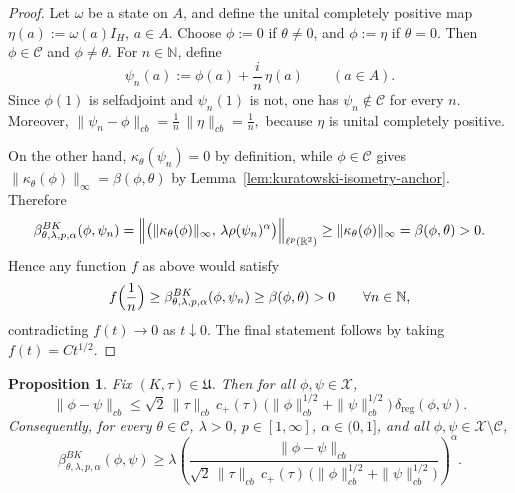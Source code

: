 \documentclass[11pt]{amsart}
\newtheorem{proposition}[theorem]{Proposition}
\theoremstyle{definition}
\theoremstyle{remark}
\newcommand{\1}{\mathbbm{1}}
\begin{document}
\begin{proof}
Let $\omega$ be a state on $A$, and define the unital completely positive map $\eta(a):=\omega(a)I_H$, $a\in A$.
Choose $\phi:=0$ if $ \theta\neq 0$, and  $\phi:=\eta$ if $\theta=0$. Then $\phi\in \mathcal C$ and $\phi\neq \theta$.
For $n\in\mathbb N$, define
\[
\psi_n(a):=\phi(a)+\frac{i}{n}\,\eta(a)\qquad(a\in A).
\]
Since $\phi(1)$ is selfadjoint and $\psi_n(1)$ is not, one has $\psi_n\notin \mathcal C$ for every $n$.
Moreover, $\|\psi_n-\phi\|_{cb}=\frac{1}{n}\,\|\eta\|_{cb}=\frac{1}{n},$
because $\eta$ is unital completely positive.

On the other hand, $\kappa_\theta(\psi_n)=0$ by definition, while $\phi\in\mathcal C$ gives $\|\kappa_\theta(\phi)\|_\infty=\beta(\phi,\theta)$
by Lemma~\ref{lem:kuratowski-isometry-anchor}. Therefore
\[
\beta^{BK}_{\theta,\lambda,p,\alpha}(\phi,\psi_n)
=\Bigl\|\bigl(\|\kappa_\theta(\phi)\|_\infty,\,\lambda\rho(\psi_n)^\alpha\bigr)\Bigr\|_{\ell^p(\mathbb R^2)}
\ge \|\kappa_\theta(\phi)\|_\infty
=\beta(\phi,\theta)>0.
\]
Hence any function $f$ as above would satisfy
\[
f\Bigl(\frac{1}{n}\Bigr)\ge \beta^{BK}_{\theta,\lambda,p,\alpha}(\phi,\psi_n)\ge \beta(\phi,\theta)>0
\qquad\forall n\in\mathbb N,
\]
contradicting $f(t)\to 0$ as $t\downarrow 0$.
The final statement follows by taking $f(t)=Ct^{1/2}$.
\end{proof}

\begin{proposition}
\label{prop:lower-KSW-nonCP}
Fix $(K,\tau)\in\mathfrak U$.
Then for all $\phi,\psi\in \mathcal X$,
\[
\|\phi-\psi\|_{cb}
\le
\sqrt2\,\|\tau\|_{cb}\, c_+(\tau)\,\bigl(\|\phi\|_{cb}^{1/2}+\|\psi\|_{cb}^{1/2}\bigr)\,\delta_{\mathrm{reg}}(\phi,\psi).
\]
Consequently, for every $\theta\in \mathcal C$, $\lambda>0$, $p\in[1,\infty]$, $\alpha\in(0,1]$, and all
$\phi,\psi\in\mathcal X\setminus \mathcal C$,
\[
\beta^{BK}_{\theta,\lambda,p,\alpha}(\phi,\psi)
\ge
\lambda\left(
\frac{\|\phi-\psi\|_{cb}}
{\sqrt2\,\|\tau\|_{cb}\, c_+(\tau)\,\bigl(\|\phi\|_{cb}^{1/2}+\|\psi\|_{cb}^{1/2}\bigr)}
\right)^\alpha.
\]
\end{proposition}
\end{document}
